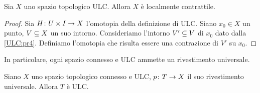 \begin{proposition}
Sia \(X\) uno spazio topologico ULC. Allora \(X\) è localmente contrattile.
\end{proposition}
\begin{proof}
Sia \(\map{H}{U\times I}{X}\) l'omotopia della definizione di ULC. Siano \(x_0\in X\) un punto, \(V\subseteq X\) un suo intorno. Consideriamo l'intorno \(V'\subseteq V\) di \(x_0\) dato dalla \ref{ULC:pr4}. Definiamo l'omotopia
che risulta essere una contrazione di \(V'\) su \(x_0\).
\end{proof}

In particolare, ogni spazio connesso e ULC ammette un rivestimento universale.

\begin{proposition}
Siano \(X\) uno spazio topologico connesso e ULC, \(\map{p}{T}{X}\) il suo rivestimento universale. Allora \(T\) è ULC.
\end{proposition}
